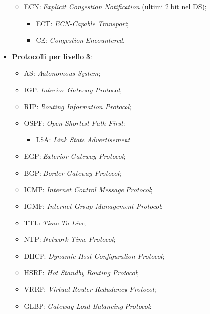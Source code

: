 \begin{itemize}
\begin{itemize}
\begin{itemize}
\end{itemize}

\item{ECN}: \emph{Explicit Congestion Notification} (ultimi 2 bit nel DS);

\begin{itemize}

\item{ECT}: \emph{ECN-Capable Transport};
\item{CE}: \emph{Congestion Encountered}.

\end{itemize}

\end{itemize}

\item{\textbf{Protocolli per livello 3}}:

\begin{itemize}

\item{AS}: \emph{Autonomous System};
\item{IGP}: \emph{Interior Gateway Protocol};
\item{RIP}: \emph{Routing Information Protocol};
\item{OSPF}: \emph{Open Shortest Path First}:

\begin{itemize}

\item{LSA}: \emph{Link State Advertisement}

\end{itemize}

\item{EGP}: \emph{Exterior Gateway Protocol};
\item{BGP}: \emph{Border Gateway Protocol};
\item{ICMP}: \emph{Internet Control Message Protocol};
\item{IGMP}: \emph{Internet Group Management Protocol};
\item{TTL}: \emph{Time To Live};
\item{NTP}: \emph{Network Time Protocol};
\item{DHCP}: \emph{Dynamic Host Configuration Protocol};
\item{HSRP}: \emph{Hot Standby Routing Protocol};
\item{VRRP}: \emph{Virtual Router Redudancy Protocol};
\item{GLBP}: \emph{Gateway Load Balancing Protocol}:

\begin{itemize}


\end{itemize}
\end{itemize}
\end{itemize}
